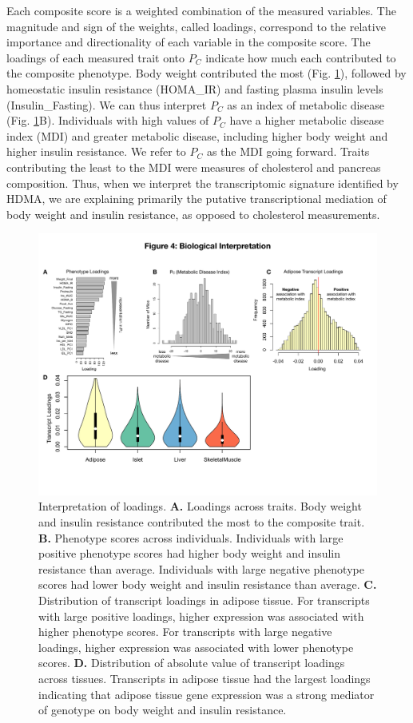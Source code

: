 \documentclass[
]{article}
\begin{document}
Each composite score is a weighted combination of the measured
variables. The magnitude and sign of the weights, called loadings,
correspond to the relative importance and directionality of each
variable in the composite score. The loadings of each measured trait
onto \(P_C\) indicate how much each contributed to the composite
phenotype. Body weight contributed the most (Fig.
\ref{fig:interpretation}), followed by homeostatic insulin resistance
(HOMA\_IR) and fasting plasma insulin levels (Insulin\_Fasting). We can
thus interpret \(P_C\) as an index of metabolic disease (Fig.
\ref{fig:interpretation}B). Individuals with high values of \(P_C\) have
a higher metabolic disease index (MDI) and greater metabolic disease,
including higher body weight and higher insulin resistance. We refer to
\(P_C\) as the MDI going forward. Traits contributing the least to the
MDI were measures of cholesterol and pancreas composition. Thus, when we
interpret the transcriptomic signature identified by HDMA, we are
explaining primarily the putative transcriptional mediation of body
weight and insulin resistance, as opposed to cholesterol measurements.

\begin{figure}[ht!]
\includegraphics[width=\textwidth]{Figures/Fig4_interpretation.pdf} 
\caption{Interpretation of loadings. \textbf{A.} Loadings 
across traits. Body weight and insulin resistance contributed 
the most to the composite trait. \textbf{B.} Phenotype scores 
across individuals. Individuals with large positive phenotype 
scores had higher body weight and insulin resistance than average. 
Individuals with large negative phenotype scores had lower body 
weight and insulin resistance than average. \textbf{C.} 
Distribution of transcript loadings in adipose tissue. For 
transcripts with large positive loadings, higher expression was 
associated with higher phenotype scores. For transcripts with 
large negative loadings, higher expression was associated with 
lower phenotype scores. \textbf{D.} Distribution of absolute 
value of transcript loadings across tissues. Transcripts in 
adipose tissue had the largest loadings indicating that 
adipose tissue gene expression was a strong mediator of 
genotype on body weight and insulin resistance.
}
\label{fig:interpretation}
\end{figure}
\end{document}
